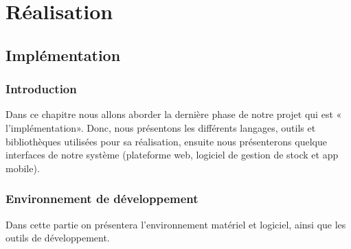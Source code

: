\documentclass[edit,12pt,a4paper,ChapStyle,oneside,doubleinterligne]{report}
\begin{document}
\clearpage 
\part{Réalisation}

\chapter{Implémentation}
\section{Introduction}
Dans ce chapitre nous allons aborder la dernière phase de notre projet qui est « l’implémentation». Donc, nous présentons les différents langages, outils et bibliothèques utilisées pour sa réalisation, ensuite nous présenterons quelque interfaces de notre système (plateforme web, logiciel de gestion de stock et app mobile).
\section{Environnement de développement }
Dans cette partie on présentera l'environnement matériel et logiciel, ainsi que les outils de développement. 
\end{document}
